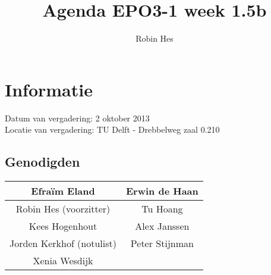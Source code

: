 \documentclass{article}
\begin{document}
\title{Agenda EPO3-1 week 1.5b}%
\author{Robin Hes}%
\maketitle

\section*{Informatie}
Datum van vergadering: 2 oktober 2013\\ %
Locatie van vergadering: TU Delft - Drebbelweg zaal 0.210 %
\subsection*{Genodigden}
\begin{center}
\begin{tabular}{|c |c |}
	\hline
	Efraïm Eland & Erwin de Haan \\
	\hline
	Robin Hes (voorzitter) & Tu Hoang \\
	\hline
	Kees Hogenhout & Alex Janssen \\
	\hline
	Jorden Kerkhof (notulist) & Peter Stijnman \\
	\hline
	Xenia Wesdijk & \\
	\hline
\end{tabular}
\end{center}
\end{document}
